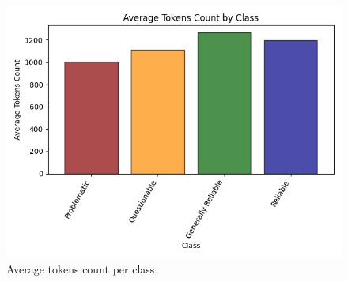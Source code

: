 \begin{figure}[ht]
    \centering
    \includegraphics[width=0.9\linewidth]{figures/tokens_count_vx_per_class_hist.png}
    \caption{Average tokens count per class}
    \label{fig:avg_tokens_count_per_class}
\end{figure}




